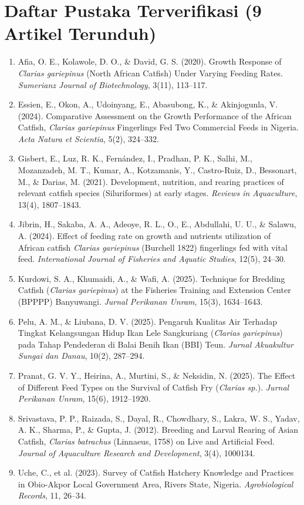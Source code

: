 \documentclass[11pt,a4paper]{article}
\begin{document}
\section{Daftar Pustaka Terverifikasi (9 Artikel Terunduh)}
\begin{enumerate}[leftmargin=*,itemsep=2pt,topsep=2pt]\small
    \item Afia, O. E., Kolawole, D. O., \& David, G. S. (2020). Growth Response of \textit{Clarias gariepinus} (North African Catfish) Under Varying Feeding Rates. \textit{Sumerianz Journal of Biotechnology}, 3(11), 113--117.
    \item Essien, E., Okon, A., Udoinyang, E., Abasubong, K., \& Akinjogunla, V. (2024). Comparative Assessment on the Growth Performance of the African Catfish, \textit{Clarias gariepinus} Fingerlings Fed Two Commercial Feeds in Nigeria. \textit{Acta Natura et Scientia}, 5(2), 324--332.
    \item Gisbert, E., Luz, R. K., Fern{\'a}ndez, I., Pradhan, P. K., Salhi, M., Mozanzadeh, M. T., Kumar, A., Kotzamanis, Y., Castro-Ruiz, D., Bessonart, M., \& Darias, M. (2021). Development, nutrition, and rearing practices of relevant catfish species (Siluriformes) at early stages. \textit{Reviews in Aquaculture}, 13(4), 1807--1843.
    \item Jibrin, H., Sakaba, A. A., Adeoye, R. L., O., E., Abdullahi, U. U., \& Salawu, A. (2024). Effect of feeding rate on growth and nutrients utilization of African catfish \textit{Clarias gariepinus} (Burchell 1822) fingerlings fed with vital feed. \textit{International Journal of Fisheries and Aquatic Studies}, 12(5), 24--30.
    \item Kurdowi, S. A., Khumaidi, A., \& Wafi, A. (2025). Technique for Bredding Catfish (\textit{Clarias gariepinus}) at the Fisheries Training and Extension Center (BPPPP) Banyuwangi. \textit{Jurnal Perikanan Unram}, 15(3), 1634--1643.
    \item Pelu, A. M., \& Liubana, D. V. (2025). Pengaruh Kualitas Air Terhadap Tingkat Kelangsungan Hidup Ikan Lele Sangkuriang (\textit{Clarias gariepinus}) pada Tahap Pendederan di Balai Benih Ikan (BBI) Teun. \textit{Jurnal Akuakultur Sungai dan Danau}, 10(2), 287--294.
    \item Pranat, G. V. Y., Heirina, A., Murtini, S., \& Neksidin, N. (2025). The Effect of Different Feed Types on the Survival of Catfish Fry (\textit{Clarias sp.}). \textit{Jurnal Perikanan Unram}, 15(6), 1912--1920.
    \item Srivastava, P. P., Raizada, S., Dayal, R., Chowdhary, S., Lakra, W. S., Yadav, A. K., Sharma, P., \& Gupta, J. (2012). Breeding and Larval Rearing of Asian Catfish, \textit{Clarias batrachus} (Linnaeus, 1758) on Live and Artificial Feed. \textit{Journal of Aquaculture Research and Development}, 3(4), 1000134.
    \item Uche, C., et al. (2023). Survey of Catfish Hatchery Knowledge and Practices in Obio-Akpor Local Government Area, Rivers State, Nigeria. \textit{Agrobiological Records}, 11, 26--34.
\end{enumerate}
\end{document}
